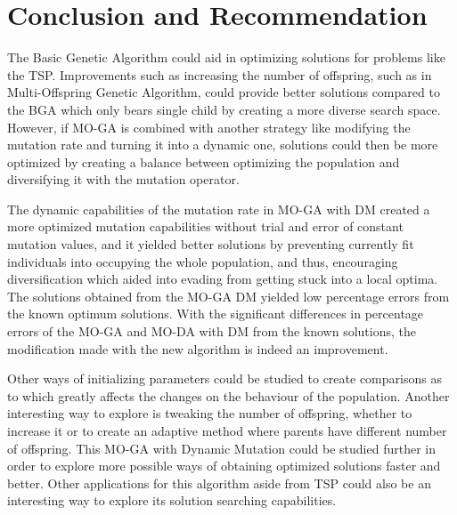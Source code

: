 \chapter{Conclusion and Recommendation}
\label{chap:Conclusion and Recommendation}

\indent \indent The Basic Genetic Algorithm could aid in optimizing solutions for problems like the TSP. Improvements such as increasing the number of offspring, such as in Multi-Offspring Genetic Algorithm, could provide better solutions compared to the BGA which only bears single child by creating a more diverse search space. However, if MO-GA is combined with another strategy like modifying the mutation rate and turning it into a dynamic one, solutions could then be more optimized by creating a balance between optimizing the population and diversifying it with the mutation operator.

\indent \indent The dynamic capabilities of the mutation rate in MO-GA with DM created a more optimized mutation capabilities without trial and error of constant mutation values, and it yielded better solutions by preventing currently fit individuals into occupying the whole population, and thus, encouraging diversification which aided into evading from getting stuck into a local optima. The solutions obtained from the MO-GA DM yielded low percentage errors from the known optimum solutions. With the significant differences in percentage errors of the MO-GA and MO-DA with DM from the known solutions, the modification made with the new algorithm is indeed an improvement.

\indent \indent Other ways of initializing parameters could be studied to create comparisons as to which greatly affects the changes on the behaviour of the population. Another interesting way to explore is tweaking the number of offspring, whether to increase it or to create an adaptive method where parents have different number of offspring. This MO-GA with Dynamic Mutation could be studied further in order to explore more possible ways of obtaining optimized solutions faster and better. Other applications for this algorithm aside from TSP could also be an interesting way to explore its solution searching capabilities. 

 
